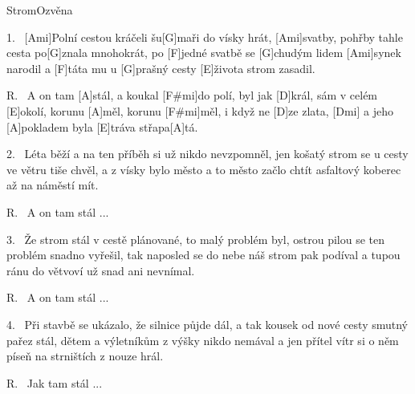 \begin{song}{Strom}{Ozvěna}

\begin{xverse}{1.~}
[Ami]Polní cestou kráčeli šu[G]maři do vísky hrát,
[Ami]svatby, pohřby tahle cesta po[G]znala mnohokrát,
po [F]jedné svatbě se [G]chudým lidem [Ami]synek narodil
a [F]táta mu u [G]prašný cesty [E]{}života strom zasadil.
\end{xverse}

\begin{xverse}{R.~}
A on tam [A]stál, a koukal [F#mi]do polí,
byl jak [D]král, sám v celém [E]okolí,
korunu [A]měl, korunu [F#mi]měl, i když ne [D]ze zlata, [Dmi]{}
a jeho [A]pokladem byla [E]tráva střapa[A]tá.
\end{xverse}

\begin{xverse}{2.~}
Léta běží a na ten příběh si už nikdo nevzpomněl,
jen košatý strom se u cesty ve větru tiše chvěl,
a z vísky bylo město a to město začlo chtít
asfaltový koberec až na náměstí mít.
\end{xverse}

\begin{xverse}{R.~}
A on tam stál ...
\end{xverse}

\begin{xverse}{3.~}
Že strom stál v cestě plánované, to malý problém byl,
ostrou pilou se ten problém snadno vyřešil,
tak naposled se do nebe náš strom pak podíval
a tupou ránu do větvoví už snad ani nevnímal.
\end{xverse}

\begin{xverse}{R.~}
A on tam stál ...
\end{xverse}


\begin{xverse}{4.~}
Při stavbě se ukázalo, že silnice půjde dál,
a tak kousek od nové cesty smutný pařez stál,
dětem a výletníkům z výšky nikdo nemával
a jen přítel vítr si o něm píseň na strništích z nouze hrál.
\end{xverse}


\begin{xverse}{R.~}
Jak tam stál ...
\end{xverse}

\end{song}

